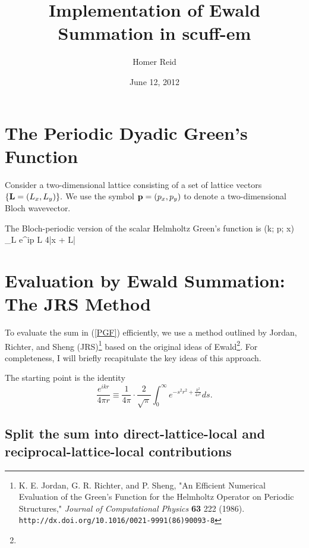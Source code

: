 \documentclass[letterpaper]{article}
\title {Implementation of Ewald Summation in {\sc scuff-em}}
\author {Homer Reid}
\date {June 12, 2012}
\newcommand{\GB}{\overline{G}}
\begin{document}
\pagestyle{myheadings}
\maketitle

\tableofcontents

\newpage

\section{The Periodic Dyadic Green's Function}

Consider a two-dimensional lattice consisting of a set of 
lattice vectors $\{\mathbf{L}=(L_x, L_y)\}.$
We use the symbol $\mathbf{p}=(p_x, p_y)$ to denote a two-dimensional
Bloch wavevector.

The Bloch-periodic version of the scalar Helmholtz Green's function is
{ \GB(k; \vb p; \vb x) 
  \equiv 
  \sum_{\vb L} e^{i\vb p \cdot \vb L} 
                    { 4\pi|\vb x + \vb L|}
}

\section{Evaluation by Ewald Summation: The JRS Method}

To evaluate the sum in (\ref{PGF}) efficiently, we use a method 
outlined by Jordan, Richter, and Sheng (JRS)\footnote{K. E. Jordan, G. R. Richter, 
and P. Sheng, "An Efficient Numerical Evaluation of the Green's 
Function for the Helmholtz Operator on Periodic Structures," 
\textit{Journal of Computational Physics} \textbf{63} 222 (1986).
\texttt{http://dx.doi.org/10.1016/0021-9991(86)90093-8}}
based on the original ideas of Ewald\footnote{}. For completeness,
I will briefly recapitulate the key ideas of this approach.

The starting point is the identity
$$ \frac{e^{ikr}}{4\pi r} 
   \equiv 
   \frac{1}{4\pi} \cdot \frac{2}{\sqrt{\pi}}
   \int_0^\infty e^{ -s^2 r^2 + \frac{k^2}{4s^2}} ds.
$$ 

\subsection*{Split the sum into direct-lattice-local and reciprocal-lattice-local
             contributions}
\end{document}
